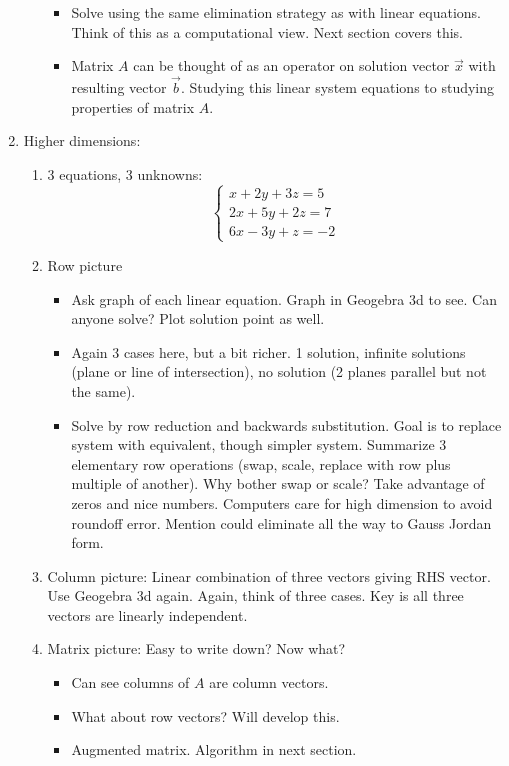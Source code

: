 \documentclass{article}
\begin{document}
\begin{enumerate}
\begin{enumerate}
\begin{itemize}
\item Solve using the same elimination strategy as with linear equations. Think of this as a computational view. Next section covers this.

\item Matrix $A$ can be thought of as an operator on solution vector $\vec{x}$ with resulting vector $\vec{b}$. Studying this linear system equations to studying properties of matrix $A$. 
\end{itemize}

\end{enumerate}


\item Higher dimensions:
\begin{enumerate}

\item 3 equations, 3 unknowns:
\[
\begin{cases}
x+2y+3z = 5 \\
2x+5y+2z = 7 \\
6x-3y+z = -2
\end{cases}
\]

\item Row picture
\begin{itemize}
\item Ask graph of each linear equation. Graph in Geogebra 3d to see. Can anyone solve? Plot solution point as well.

\item Again 3 cases here, but a bit richer. 1 solution, infinite solutions (plane or line of intersection), no solution (2 planes parallel but not the same). 

\item Solve by row reduction and backwards substitution. Goal is to replace system with equivalent, though simpler system. Summarize 3 elementary row operations (swap, scale, replace with row plus multiple of another). Why bother swap or scale? Take advantage of zeros and nice numbers. Computers care for high dimension to avoid roundoff error. Mention could eliminate all the way to Gauss Jordan form.

\end{itemize}

\item Column picture: Linear combination of three vectors giving RHS vector. Use Geogebra 3d again. Again, think of three cases. Key is all three vectors are linearly independent.

\item Matrix picture: Easy to write down? Now what?
\begin{itemize}
\item Can see columns of $A$ are column vectors. 
\item What about row vectors? Will develop this.
\item Augmented matrix. Algorithm in next section.
\end{itemize}


\end{enumerate}
\end{enumerate}
\end{document}
